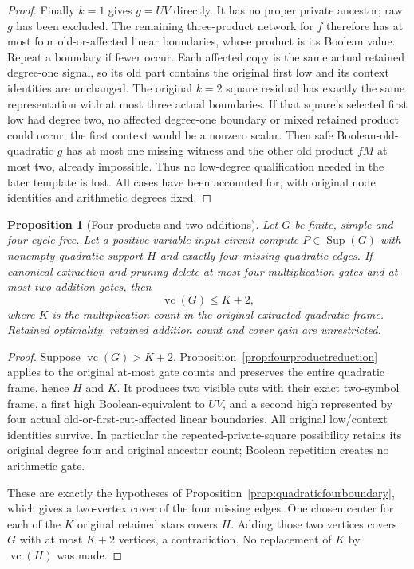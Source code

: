 \documentclass[11pt]{article}
\newcommand{\Sup}{\operatorname{Sup}}
\newcommand{\vc}{\operatorname{vc}}
\newtheorem{proposition}[theorem]{Proposition}
\theoremstyle{definition}
\theoremstyle{remark}
\begin{document}
\begin{proof}
Finally $k=1$ gives $g=UV$ directly. It has no proper private ancestor; raw $g$ has been excluded. The remaining three-product network for $f$ therefore has at most four old-or-affected linear boundaries, whose product is its Boolean value. Repeat a boundary if fewer occur. Each affected copy is the same actual retained degree-one signal, so its old part contains the original first low and its context identities are unchanged. The original $k=2$ square residual has exactly the same representation with at most three actual boundaries. If that square's selected first low had degree two, no affected degree-one boundary or mixed retained product could occur; the first context would be a nonzero scalar. Then safe Boolean-old-quadratic $g$ has at most one missing witness and the other old product $fM$ at most two, already impossible. Thus no low-degree qualification needed in the later template is lost. All cases have been accounted for, with original node identities and arithmetic degrees fixed.
\end{proof}

\begin{proposition}[Four products and two additions]\label{prop:fourproductstwosumscover}
Let $G$ be finite, simple and four-cycle-free. Let a positive variable-input circuit compute $P\in\Sup(G)$ with nonempty quadratic support $H$ and exactly four missing quadratic edges. If canonical extraction and pruning delete at most four multiplication gates and at most two addition gates, then
\[
 \vc(G)\le K+2,
\]
where $K$ is the multiplication count in the original extracted quadratic frame. Retained optimality, retained addition count and cover gain are unrestricted.
\end{proposition}
\begin{proof}
Suppose $\vc(G)>K+2$. Proposition~\ref{prop:fourproductreduction} applies to the original at-most gate counts and preserves the entire quadratic frame, hence $H$ and $K$. It produces two visible cuts with their exact two-symbol frame, a first high Boolean-equivalent to $UV$, and a second high represented by four actual old-or-first-cut-affected linear boundaries. All original low/context identities survive. In particular the repeated-private-square possibility retains its original degree four and original ancestor count; Boolean repetition creates no arithmetic gate.

These are exactly the hypotheses of Proposition~\ref{prop:quadraticfourboundary}, which gives a two-vertex cover of the four missing edges. One chosen center for each of the $K$ original retained stars covers $H$. Adding those two vertices covers $G$ with at most $K+2$ vertices, a contradiction. No replacement of $K$ by $\vc(H)$ was made.
\end{proof}
\end{document}

